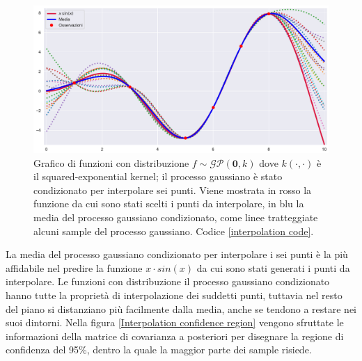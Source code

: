\begin{figure}[h]
    \centering
    \includegraphics[width=1\textwidth]{images/Gaussian process/Noise-free - mean&f(x).pdf}
    \caption{Grafico di funzioni con distribuzione $f\sim \mathcal{GP}(\bm{0},k)$ dove $k(\cdot,\cdot)$ è il squared-exponential kernel; il processo gaussiano è stato condizionato per interpolare sei punti. Viene mostrata in rosso la funzione da cui sono stati scelti i punti da interpolare, in blu la media del processo gaussiano condizionato, come linee tratteggiate alcuni sample del processo gaussiano. Codice \ref{interpolation code}.}
    \label{Interpolation}
\end{figure}

La media del processo gaussiano condizionato per interpolare i sei punti è la più affidabile nel predire la funzione $x\cdot sin(x)$ da cui sono stati generati i punti da interpolare. Le funzioni con distribuzione il processo gaussiano condizionato hanno tutte la proprietà di interpolazione dei suddetti punti, tuttavia nel resto del piano si distanziano più facilmente dalla media, anche se tendono a restare nei suoi dintorni. Nella figura \ref{Interpolation confidence region} vengono sfruttate le informazioni della matrice di covarianza a posteriori per disegnare la regione di confidenza del 95\%, dentro la quale la maggior parte dei sample risiede.


